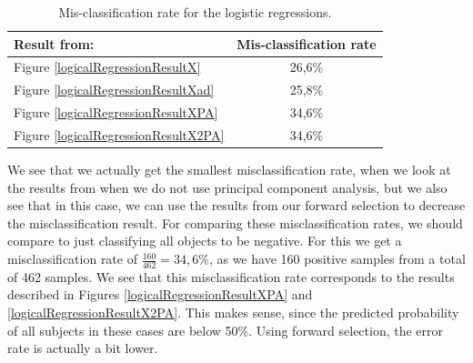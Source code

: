 \begin{table}[H]
\begin{longtable}{lc} \hline
Result from: & Mis-classification rate \\ \hline
Figure \ref{logicalRegressionResultX} & 26,6\% \\ 
Figure \ref{logicalRegressionResultXad} & 25,8\% \\ 
Figure \ref{logicalRegressionResultXPA} & 34,6\% \\ 
Figure \ref{logicalRegressionResultX2PA} & 34,6\% \\ \hline
\end{longtable}
\caption{Mis-classification rate for the logistic regressions.}
\label{logicalRegressionErrorRate}
\end{table}
We see that we actually get the smallest misclassification rate, when we look at the results from when we do not use principal component analysis, but we also see that in this case, we can use the results from our forward selection to decrease the misclassification result. For comparing these misclassification rates, we should compare to just classifying all objects to be negative. For this we get a misclassification rate of $\frac{160}{462}=34,6\%$, as we have 160 positive samples from a total of 462 samples. We see that this misclassification rate corresponds to the results described in Figures \ref{logicalRegressionResultXPA} and \ref{logicalRegressionResultX2PA}. This makes sense, since the predicted probability of all subjects in these cases are below 50\%.
Using forward selection, the error rate is actually a bit lower.